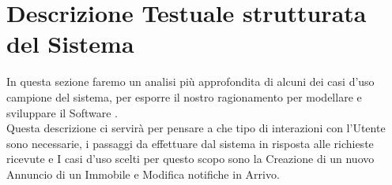 \section{Descrizione Testuale strutturata del Sistema}
In questa sezione faremo un analisi più approfondita di alcuni dei casi d'uso campione del sistema, per esporre il nostro ragionamento per modellare e sviluppare il Software .\\
Questa descrizione ci servirà per pensare a che tipo di interazioni con l'Utente sono necessarie, i passaggi da effettuare  dal sistema in risposta alle richieste ricevute e 
I casi d'uso scelti per questo scopo sono la Creazione di un nuovo Annuncio di un Immobile e Modifica notifiche in Arrivo.
  



\newpage


